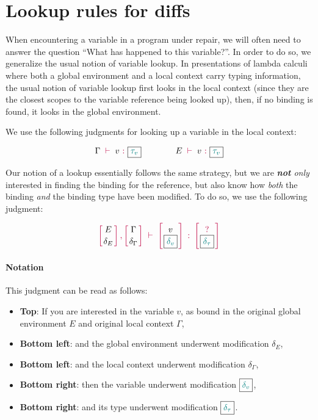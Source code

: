 \section{Lookup rules for diffs}

When encountering a variable in a program under repair, we will often need to
answer the question ``What has happened to this variable?''.  In order to do so,
we generalize the usual notion of variable lookup.  In presentations of lambda
calculi where both a global environment and a local context carry typing
information, the usual notion of variable lookup first looks in the local
context (since they are the closest scopes to the variable reference being
looked up), then, if no binding is found, it looks in the global environment.

We use the following judgments for looking up a variable in the local context:

\[
  \Gamma\ \mathbin{\textcolor{purple}{\vdash}}\   v \ \textcolor{purple}{:}\  \boxed{ \textcolor{teal}{\tau_v} } 
  \qquad \qquad
  E\ \mathbin{\textcolor{purple}{\vdash}}\   v \ \textcolor{purple}{:}\  \boxed{ \textcolor{teal}{\tau_v} } 
\]

Our notion of a lookup essentially follows the same strategy, but we are
\emph{\textbf{not} only} interested in finding the binding for the reference,
but also know how \emph{both} the binding \emph{and} the binding type have been
modified.  To do so, we use the following judgment:

{
  \[
    \turnstile
    {\dcontext {E} {\delta_E} {\Gamma} {\delta_\Gamma} }
    { \declDiff { v } { \delta_v } { \delta_{\tau} } }
  \]
}

\paragraph{Notation} This judgment can be read as follows:
\begin{itemize}
\item \textbf{Top}: If you are interested in the variable $v$, as bound in the original global environment $E$ and original local context $\Gamma$,
\item \textbf{Bottom left}: and the global environment underwent modification $\delta_{E}$,
\item \textbf{Bottom left}: and the local context underwent modification $\delta_{\Gamma}$,
\item \textbf{Bottom right}: then the variable underwent modification
$\boxed{ \textcolor{teal}{\delta_{v}} }$,
\item \textbf{Bottom right}: and its type underwent modification
$\boxed{ \textcolor{teal}{\delta_{\tau}} }$.
\end{itemize}

